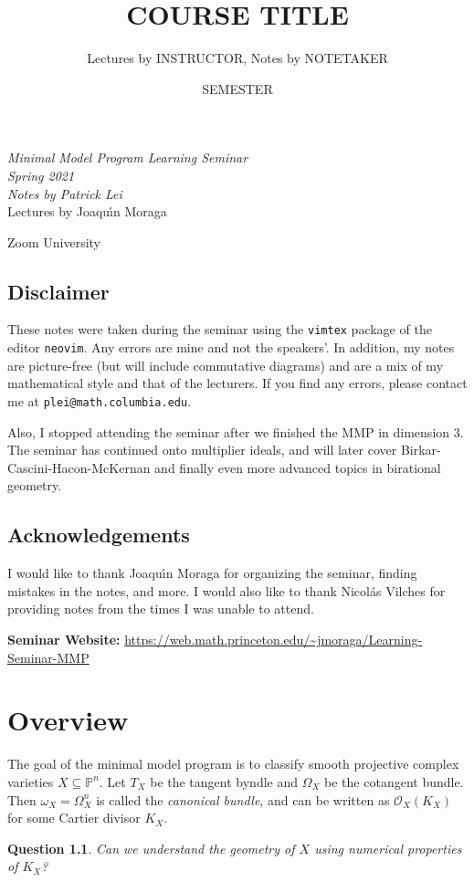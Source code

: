 \documentclass[leqno, openany]{memoir}
\title{COURSE TITLE}
\author{Lectures by INSTRUCTOR, Notes by NOTETAKER}
\date{SEMESTER}
\newtheorem{quest}[thm]{Question}
\theoremstyle{definition}
\theoremstyle{remark}
\theoremstyle{plain}
\theoremstyle{definition}
\theoremstyle{remark}
\renewcommand{\P}{\mathbb{P}}
\newcommand{\mc}[1]{\mathcal{#1}}
\newcommand*{\titleSW}
    {\begingroup%
    \raggedleft
    \vspace*{\baselineskip}
    {\Huge\itshape Minimal Model Program Learning Seminar \\ Spring 2021}\\[\baselineskip]
    {\large\itshape Notes by Patrick Lei}\\[0.2\textheight]
    {\Large Lectures by Joaqu\'{\i}n Moraga}\par
    \vfill
    {\Large \sffamily Zoom University}
    \vspace*{\baselineskip}
\endgroup}
\begin{document}
    
\begin{titlingpage}
\titleSW
\end{titlingpage}

\thispagestyle{empty}
\section*{Disclaimer}%
\label{sec:disclaimer}

These notes were taken during the seminar using the \texttt{vimtex} package of the editor \texttt{neovim}. 
Any errors are mine and not the speakers'. 
In addition, my notes are picture-free (but will include commutative diagrams) and are a mix of my mathematical style and that of the lecturers.
If you find any errors, please contact me at \texttt{plei@math.columbia.edu}.

Also, I stopped attending the seminar after we finished the MMP in dimension $3$. The seminar has continued onto multiplier ideals, and will later cover Birkar-Cascini-Hacon-McKernan and finally even more advanced topics in birational geometry.

\section*{Acknowledgements}%
\label{sec:acknowledgements}

I would like to thank Joaqu\'{\i}n Moraga for organizing the seminar, finding mistakes in the notes, and more. I would also like to thank Nicol\'as Vilches for providing notes from the times I was unable to attend.

\vspace*{1cm}

\noindent\textbf{Seminar Website:}  \url{https://web.math.princeton.edu/~jmoraga/Learning-Seminar-MMP}
\newpage


\tableofcontents

\chapter{Overview}%
\label{cha:overview}

The goal of the minimal model program is to classify smooth projective complex varieties $X \subseteq \P^n$. Let $T_X$ be the tangent byndle and $\Omega_X$ be the cotangent bundle. Then $\omega_X = \Omega_X^n$ is called the \textit{canonical bundle}, and can be written as $\mc{O}_X(K_X)$ for some Cartier divisor $K_X$.

\begin{quest}
    Can we understand the geometry of $X$ using numerical properties of $K_X$?
\end{quest}
\end{document}
